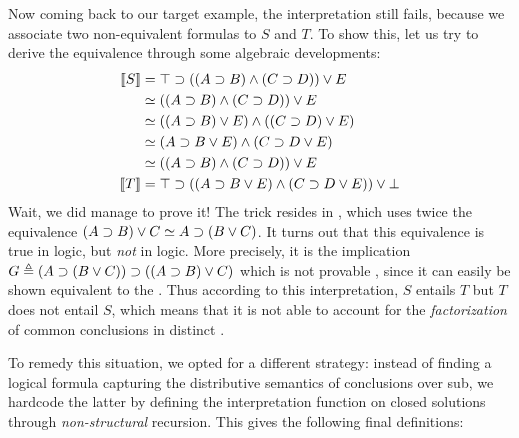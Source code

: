 \begin{scope}
Now coming back to our target example,
the interpretation still fails, because we associate two non-equivalent
formulas to $S$ and $T$. To show this, let us try to derive the equivalence
through some algebraic developments:
\begin{align}
  \sint{S} &= \top \limp ((A \limp B) \land (C \limp D)) \lor E \nonumber\\
              &\semequiv ((A \limp B) \land (C \limp D)) \lor E \nonumber\\
              &\semequiv ((A \limp B) \lor E) \land ((C \limp D) \lor E) \nonumber\\
              &\semequiv (A \limp B \lor E) \land (C \limp D \lor E) \labeq{grishin}\\
              &\semequiv ((A \limp B) \land (C \limp D)) \lor E \nonumber\\
  \sint{T} &= \top \limp ((A \limp B \lor E) \land (C \limp D \lor E)) \lor \bot \nonumber
\end{align}
Wait, we did manage to prove it! The trick resides in , which
uses twice the equivalence $(A \supset B) \lor C \simeq A \supset (B \lor C)$. It
turns out that this equivalence is true in  logic, but \emph{not} in
 logic. More precisely, it is the implication $G \triangleq (A \supset
(B \lor C)) \supset ((A \supset B) \lor C)$ which is not provable
, since it can easily be shown equivalent to the . Thus according to this interpretation, $S$
entails $T$ but $T$ does not entail $S$, which means that it is not able to
account for the \emph{factorization} of common conclusions in distinct .

To remedy this situation, we opted for a different strategy: instead of finding
a logical formula capturing the distributive semantics of conclusions over
sub, we hardcode the latter by defining the interpretation function on
closed solutions through \emph{non-structural} recursion. This gives the
following final definitions:


\end{scope}
